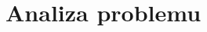 \documentclass[../../thesis.tex]{subfiles}
\begin{document}
\chapter{Analiza problemu}
\end{document}
